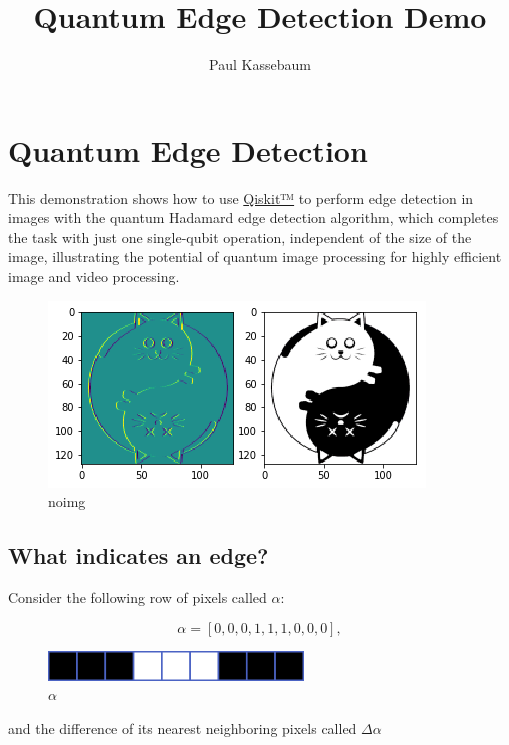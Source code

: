 \documentclass[11pt]{article}
\title{Quantum Edge Detection Demo}
\author{Paul Kassebaum}
\makeatletter
\def\maxwidth{\ifdim\Gin@nat@width>\linewidth\linewidth
    \else\Gin@nat@width\fi}
\let\Oldincludegraphics\includegraphics
\renewcommand{\includegraphics}[1]{\Oldincludegraphics[width=.8\maxwidth]{#1}}
\makeatother
\begin{document}
    
    
    \maketitle
    


    \hypertarget{quantum-edge-detection}{%
\section{Quantum Edge Detection}\label{quantum-edge-detection}}

This demonstration shows how to use \href{https://qiskit.org/}{Qiskit™}
to perform edge detection in images with the quantum Hadamard edge
detection algorithm, which completes the task with just one single-qubit
operation, independent of the size of the image, illustrating the
potential of quantum image processing for highly efficient image and
video processing.

\begin{figure}
\centering
\includegraphics{../img/edge.png}
\caption{noimg}
\end{figure}

    \hypertarget{what-indicates-an-edge}{%
\subsection{What indicates an edge?}\label{what-indicates-an-edge}}

    Consider the following row of pixels called \(\alpha\):

\[\alpha = [0, 0, 0, 1, 1, 1, 0, 0, 0],\]

\begin{figure}[h]
\centering
\includegraphics{../img/p.png}
\caption{$\alpha$}
\end{figure}

and the difference of its nearest neighboring pixels called
\(\Delta \alpha\)
\end{document}

